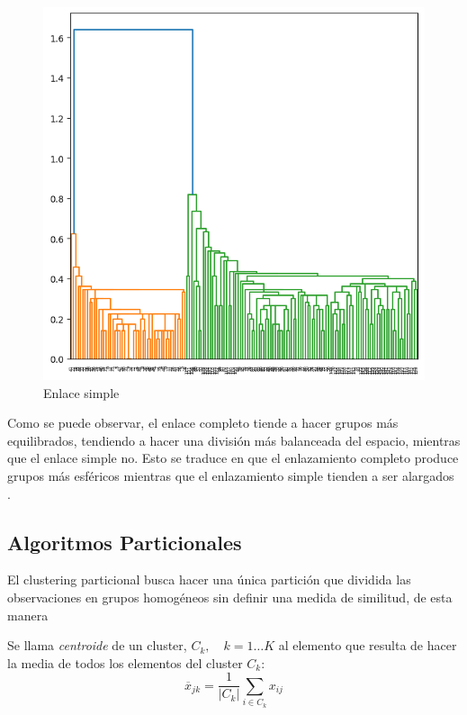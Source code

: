 \begin{figure}[ht]
\begin{minipage}{0.45\textwidth}
    \includegraphics[width=\textwidth]{Documentos Extra/Imagenes/single_linkage.png}
    \caption{Enlace simple}
    \label{fig:single_linkage}
  \end{minipage}
 \end{figure}

\noindent Como se puede observar, el enlace completo tiende a hacer grupos más equilibrados, tendiendo a hacer una división más balanceada del espacio, mientras que el enlace simple no. Esto se traduce en que el enlazamiento completo produce grupos más esféricos mientras que el enlazamiento simple tienden a ser alargados \cite{Peña 2002}. 

\subsection{Algoritmos Particionales}

\noindent El clustering particional busca hacer una única partición que dividida las observaciones en grupos homogéneos sin definir una medida de similitud, de esta manera 

\begin{defi}
Se llama \emph{centroide} de un cluster, $C_k,\quad k=1\ldots K$ al elemento que resulta de hacer la media de todos los elementos del cluster $C_k$:
\begin{equation}
\overline{x}_{jk}=\dfrac{1}{|C_k|}\sum_{i\in C_k} x_{ij}
\end{equation}
\end{defi}

